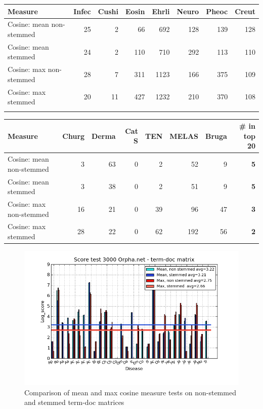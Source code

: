 \begin{table}[H]
  \begin{tiny}
  \label{testResult_termDoc_bmj_hist_3000_ns_mea_s_mea_ns_max_s_max}
  \begin{tabular}{|l|r|r|r|r|r|r|r|}
    \hline
    Measure &Infec&Cushi&Eosin&Ehrli&Neuro&Pheoc&Creut \\
    \hline
    Cosine: mean non-stemmed &25&2&66&692&128&139&128 \\
    \hline
    Cosine: mean stemmed &24&2&110&710&292&113&110 \\
    \hline
    Cosine: max non-stemmed &28&7&311&1123&166&375&109 \\
    \hline
    Cosine: max stemmed &20&11&427&1232&210&370&108 \\
    \hline
  \multicolumn{8}{c}{} \\
  \end{tabular}
  \begin{tabular}{|l|r|r|r|r|r|r|r|}
    \hline
    Measure &Churg&Derma&Cat S&TEN&MELAS&Bruga& \scriptsize{\textbf{\# in top 20}} \\
    \hline
    Cosine: mean non-stemmed &3&63&0&2&52&9& \scriptsize{\textbf{5}} \\
    \hline
    Cosine: mean stemmed &3&38&0&2&51&9& \scriptsize{\textbf{5}}\\
    \hline
    Cosine: max non-stemmed &16&21&0&39&96&47& \scriptsize{\textbf{3}} \\
    \hline
    Cosine: max stemmed &28&22&0&62&192&56& \scriptsize{\textbf{2}} \\
    \hline
  \end{tabular}
  \end{tiny}
\end{table}

\begin{figure}[H]
  \caption{Comparison of mean and max cosine measure tests on non-stemmed and stemmed term-doc matrices}
  \begin{center}
    \includegraphics[width=1.2\textwidth]{barcharts/termDoc_orphan_hist_3000_ns_mea_s_mea_ns_max_s_max.png}
  \end{center}
  \label{termDoc_orphan_hist_3000_ns_mea_s_mea_ns_max_s_max}
\end{figure}

